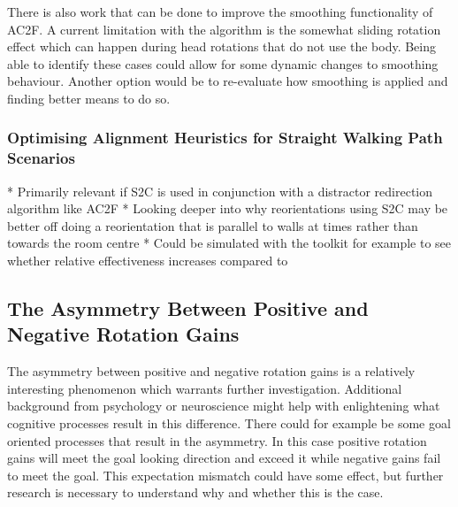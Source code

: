 There is also work that can be done to improve the smoothing functionality of AC2F. A current limitation with the algorithm is the somewhat sliding rotation effect which can happen during head rotations that do not use the body. Being able to identify these cases could allow for some dynamic changes to smoothing behaviour. Another option would be to re-evaluate how smoothing is applied and finding better means to do so. 

\subsubsection{Optimising Alignment Heuristics for Straight Walking Path Scenarios}
   * Primarily relevant if S2C is used in conjunction with a distractor redirection algorithm like AC2F
   * Looking deeper into why reorientations using S2C may be better off doing a reorientation that is parallel to walls at times rather than towards the room centre
      * Could be simulated with the toolkit for example to see whether relative effectiveness increases compared to 

\subsection{The Asymmetry Between Positive and Negative Rotation Gains}
The asymmetry between positive and negative rotation gains is a relatively interesting phenomenon which warrants further investigation. Additional background from psychology or neuroscience might help with enlightening what cognitive processes result in this difference. There could for example be some goal oriented processes that result in the asymmetry. In this case positive rotation gains will meet the goal looking direction and exceed it while negative gains fail to meet the goal. This expectation mismatch could have some effect, but further research is necessary to understand why and whether this is the case. 
      
